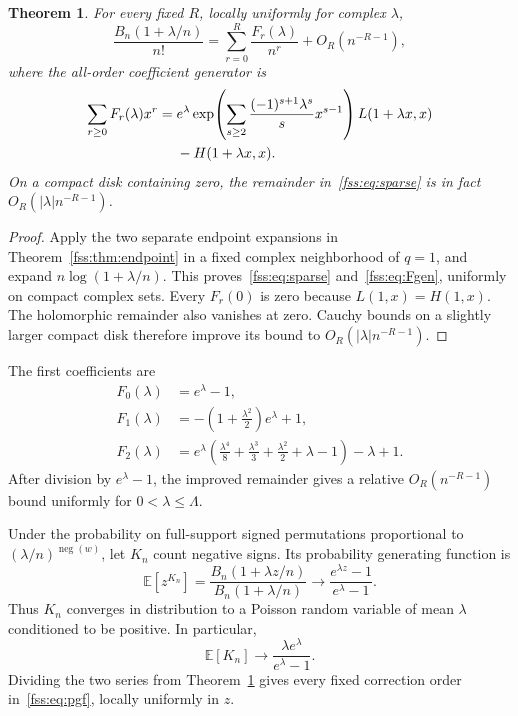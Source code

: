 \documentclass[11pt]{article}
\newtheorem{theorem}{Theorem}
\DeclareMathOperator{\negnum}{neg}
\begin{document}
\begin{theorem}\label{fss:thm:sparse}
For every fixed $R$, locally uniformly for complex $\lambda$,
\begin{equation}\label{fss:eq:sparse}
 \frac{B_n(1+\lambda/n)}{n!}
 =\sum_{r=0}^R\frac{F_r(\lambda)}{n^r}+O_R(n^{-R-1}),
\end{equation}
where the all-order coefficient generator is
\begin{align}\label{fss:eq:Fgen}
 \sum_{r\ge0}F_r(\lambda)x^r
 ={}&e^\lambda\exp\!\left(\sum_{s\ge2}
 \frac{(-1)^{s+1}\lambda^s}{s}x^{s-1}\right)
 L(1+\lambda x,x)\notag\\
 &-H(1+\lambda x,x).
\end{align}
On a compact disk containing zero, the remainder in~\eqref{fss:eq:sparse} is in fact $O_R(|\lambda|n^{-R-1})$.
\end{theorem}
\begin{proof}
Apply the two separate endpoint expansions in Theorem~\ref{fss:thm:endpoint} in a fixed complex neighborhood of $q=1$, and expand $n\log(1+\lambda/n)$. This proves~\eqref{fss:eq:sparse} and~\eqref{fss:eq:Fgen}, uniformly on compact complex sets. Every $F_r(0)$ is zero because $L(1,x)=H(1,x)$. The holomorphic remainder also vanishes at zero. Cauchy bounds on a slightly larger compact disk therefore improve its bound to $O_R(|\lambda|n^{-R-1})$.
\end{proof}
The first coefficients are
\begin{align}
 F_0(\lambda)&=e^\lambda-1,\label{fss:eq:F0}\\
 F_1(\lambda)&=-\left(1+\frac{\lambda^2}{2}\right)e^\lambda+1,\label{fss:eq:F1}\\
 F_2(\lambda)&=e^\lambda\left(\frac{\lambda^4}{8}+\frac{\lambda^3}{3}
 +\frac{\lambda^2}{2}+\lambda-1\right)-\lambda+1.\label{fss:eq:F2}
\end{align}
After division by $e^\lambda-1$, the improved remainder gives a relative $O_R(n^{-R-1})$ bound uniformly for $0<\lambda\le\Lambda$.

Under the probability on full-support signed permutations proportional to $(\lambda/n)^{\negnum(w)}$, let $K_n$ count negative signs. Its probability generating function is
\begin{equation}\label{fss:eq:pgf}
 \mathbb E[z^{K_n}]=\frac{B_n(1+\lambda z/n)}{B_n(1+\lambda/n)}
 \longrightarrow\frac{e^{\lambda z}-1}{e^\lambda-1}.
\end{equation}
Thus $K_n$ converges in distribution to a Poisson random variable of mean $\lambda$ conditioned to be positive. In particular,
\[
 \mathbb E[K_n]\longrightarrow\frac{\lambda e^\lambda}{e^\lambda-1}.
\]
Dividing the two series from Theorem~\ref{fss:thm:sparse} gives every fixed correction order in~\eqref{fss:eq:pgf}, locally uniformly in $z$.
\end{document}
